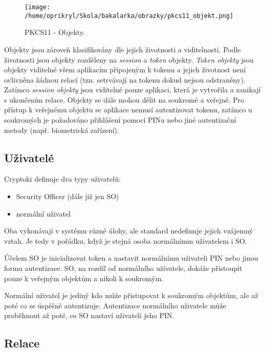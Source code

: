 \documentclass[]{fithesis3}
\begin{document}
		\begin{figure}[!ht]
  			\begin{minipage}{1.00\textwidth}
    				\texttt{[image: /home/oprikryl/Skola/bakalarka/obrazky/pkcs11\_objekt.png]}
  			\end{minipage}
 			\caption{PKCS11 - Objekty.}
  			\label{fig:PKCS11 - Objekty.}
		\end{figure}

		Objekty jsou zároveň klasifikovány dle jejich životnosti a viditelnosti. Podle životnosti jsou 			objekty rozděleny na \textit{session} a \textit{token} objekty. \textit{Token objekty} jsou 			objekty viditelné všem aplikacím připojeným k tokenu a jejich životnost není ovlivněna 				žádnou relací (tzn. setrvávají na tokenu dokud nejsou odstraněny). Zatímco 						\textit{session objekty} jsou viditelné pouze aplikaci, která je vytvořila a zanikají s 					ukončením relace.
		Objekty se dále mohou dělit na soukromé a veřejné. Pro přístup k veřejnému objektu se 			aplikace nemusí autentizovat tokenu, zatímco u soukromých je požadováno přihlášení 				pomocí PINu nebo jiné autentizační metody (např. biometrická zařízení).

		\newpage
		\subsection{Uživatelé}

		Cryptoki definuje dva typy uživatelů: 
		\begin{itemize}
			\item Security Officer (dále již jen SO) 
			\item normální uživatel
		\end{itemize}
		Oba vykonávají v systému různé úlohy, ale standard nedefinuje jejich vzájemný vztah. Je 			tedy v pořádku, když je stejná osoba normálnímm uživatelem i SO.

		Účelem SO je inicializovat token a nastavit normálnímu uživateli PIN nebo jinou formu 				autentizace. SO, na rozdíl od normálního uživatele, dokáže přistoupit pouze k veřejným 			objektům a nikoli k soukromým.

		Normální uživatel je jediný kdo může přistupovat k soukromým objektům, ale až poté co	
		se úspěšně autentizuje. Autentizace normálního uživatele může proběhnout až poté, co SO 		nastaví uživateli jeho PIN.

		\subsection{Relace}
\end{document}
